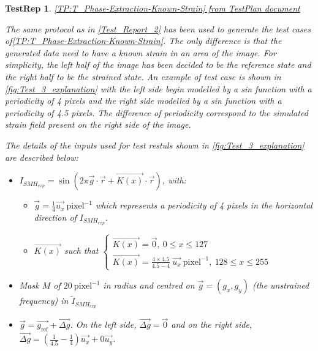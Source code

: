 \documentclass[12pt, titlepage]{article}
\newtheorem{TestRep}{TestRep}
\begin{document}
\begin{TestRep}\normalfont\underline{{\cref{TP:T_Phase-Extraction-Known-Strain}} 
from TestPlan document} \label{Test_Report_3} \newline

The same protocol as in \cref{Test_Report_2} has been used to generate the test 
cases of\cref{TP:T_Phase-Extraction-Known-Strain}. The only difference is that 
the generated data need to have a known strain in an area of the image. For 
simplicity, the left half of the image has been decided to be the reference 
state and the right half to be the strained state. An example of test case is 
shown in \cref{fig:Test_3_explanation} with the left side begin modelled by a 
sin function with a periodicity of 4 pixels and the right side modelled by a sin 
function with a periodicity of 4.5 pixels. The difference of periodicity 
correspond to the simulated strain field present on the right side of the 
image.\medskip

The details of the inputs used for test restuls shown in 
\cref{fig:Test_3_explanation} are  described below:
\begin{itemize}
\item $I_{SMH_{exp}}=\sin{(2\pi \overrightarrow{g}\cdot\overrightarrow{r} + 
\overrightarrow{K(x)}\cdot\overrightarrow{r})}$, with:
	\begin{itemize}
	\item $\overrightarrow{g} = \frac{1}{4} \overrightarrow{u_x} \ 
\text{pixel}^{-1}$ which represents a periodicity of 4 pixels in the horizontal 
direction of $I_{SMH_{exp}}$.
	\item $\overrightarrow{K(x)}$ such that $\begin{cases}
	\overrightarrow{K(x)}=\overrightarrow{0}, \ 0\leq x\leq127 \\
	\overrightarrow{K(x)}=\frac{4\times4.5}{4.5-4} \ \overrightarrow{u_x} \ 
\text{pixel}^{-1}, \ 128\leq x\leq 255
	\end{cases}$
	\end{itemize}
\item Mask $M$ of $20 \ \text{pixel}^{-1}$ in radius and centred on 
$\overrightarrow{g}=(g_x,g_y)$ (the unstrained frequency) in 
$\widetilde{I}_{SMH_{exp}}$
\item $\overrightarrow{g} = \overrightarrow{g_\text{ref}} + 
\overrightarrow{\Delta g}$. On the left side, $\overrightarrow{\Delta g} = 
\overrightarrow{0}$ and on the right side, $\overrightarrow{\Delta g} = 
(\frac{1}{4.5}-\frac{1}{4})\overrightarrow{u_x} + 0 \overrightarrow{u_y}$.
\end{itemize}


\end{TestRep}
\end{document}
